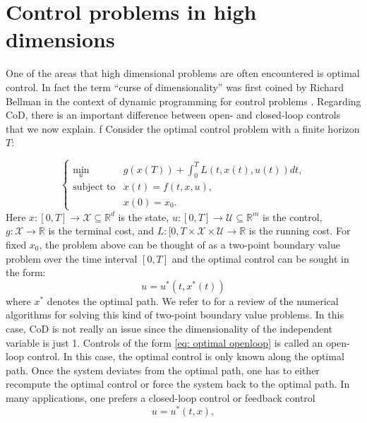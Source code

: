 \documentclass[12pt,AutoFakeBold,AutoFakeSlant]{article}
\theoremstyle{definition}
\newcommand{\R}{\mathbb{R}}
\newcommand{\bx}{{x}}
\begin{document}
	\section{Control problems in high dimensions}
	\label{sec:control}

	One of the areas that high dimensional problems are often encountered is optimal control. In fact the term ``curse of dimensionality''
	was first coined by Richard Bellman in the context of dynamic programming for control problems \cite{Bellman1957}.
	Regarding CoD, there is an important difference between open- and closed-loop controls that we now explain.
	f%
	Consider the optimal control problem with a finite horizon $T$:

	\begin{equation}
	\label{eq:OCP}
	\left \{
	\begin{array}{cl}
	\underset{ u}{\text{min}} & g ( x (T)) + \displaystyle \int_0^{T} L (t,  x(t), u(t)) dt , \\
	\text{subject to} & \dot { x} (t) = f (t,  x,  u) , \\
			&  x (0) =  x_0 .
	\end{array}
	\right .
	\end{equation}
	Here $ x : [0, T] \to \mathcal X \subseteq \R^d$ is the state, $ u : [0, T] \to \mathcal U \subseteq  \R^m$ is the control, 
	$g: \mathcal X \to \R$ is the terminal cost, and $L: [0, T \times \mathcal X \times \mathcal U \to \R$ is the running cost.
	For fixed $\bx_0$, the problem above can be thought of as a two-point boundary value problem over the time interval $[0, T]$ and
	the optimal control can be sought in the form: 
	\begin{equation}
	\label{eq: optimal openloop}
	u = u^* (t,  x^*(t))
	\end{equation}
	where $\bx^*$ denotes the optimal path.  We refer to \cite{Rao2009survey} for a review of the numerical algorithms for solving
	this kind of two-point boundary value problems. In this case, CoD is not really an issue since the dimensionality of the independent
	variable is just 1.
	Controls of the form \eqref{eq: optimal openloop} is called an open-loop control.  In this case, the optimal control is only known along the optimal path.
	Once the system deviates from the optimal path, one has to either recompute the optimal control or force
	the system back to the optimal path.  
	In many applications, one prefers a closed-loop control or feedback control
	\begin{equation}
	\label{eq: optimal feedback}
	u = u^* (t, x),
	\end{equation}
\end{document}
